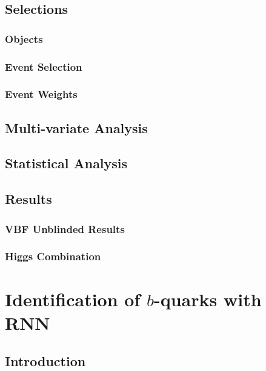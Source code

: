 \documentclass{report}
\begin{document}
\section{Selections}
\subsection{Objects}

\subsection{Event Selection}

\subsection{Event Weights}

\clearpage

\section{Multi-variate Analysis}

\clearpage

\section{Statistical Analysis}

\clearpage

\section{Results}
\subsection{VBF \Hbb Unblinded Results}

\subsection{Higgs Combination}
%

\clearpage


\chapter{Identification of $b$-quarks with RNN}
\label{chap:btagging}
\section{Introduction}

\clearpage
\end{document}
